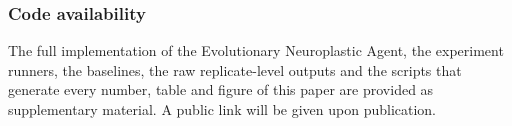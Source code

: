 \subsubsection*{Code availability}

The full implementation of the Evolutionary Neuroplastic Agent, the experiment runners, the baselines, the raw replicate-level outputs and the scripts that generate every number, table and figure of this paper are provided as supplementary material. A public link will be given upon publication.
